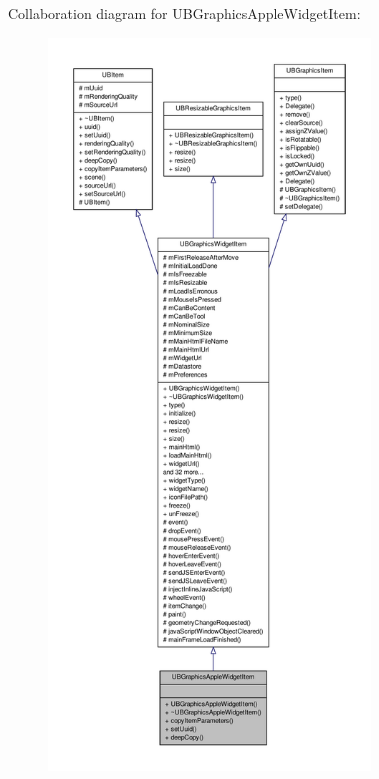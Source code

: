 Collaboration diagram for U\-B\-Graphics\-Apple\-Widget\-Item\-:
\nopagebreak
\begin{figure}[H]
\begin{center}
\leavevmode
\includegraphics[height=550pt]{df/dca/class_u_b_graphics_apple_widget_item__coll__graph}
\end{center}
\end{figure}
